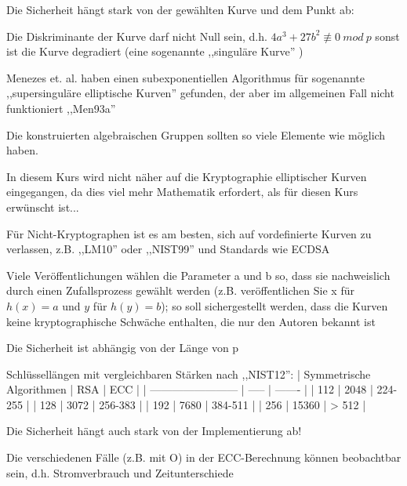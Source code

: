 \documentclass[a4paper]{article}
\begin{document}
\begin{multicols}{3}
      \begin{itemize*}
            \item Die Sicherheit hängt stark von der gewählten Kurve und dem Punkt ab:
            \item Die Diskriminante der Kurve darf nicht Null sein, d.h.
            $4a^3+27b^2\not\equiv
                  0\ mod\ p$ sonst ist die Kurve
            degradiert (eine sogenannte ,,singuläre Kurve'' )
            \item Menezes et. al. haben einen subexponentiellen Algorithmus für
            sogenannte ,,supersinguläre elliptische Kurven'' gefunden, der aber im
            allgemeinen Fall nicht funktioniert ,,Men93a''
            \item Die konstruierten algebraischen Gruppen sollten so viele Elemente wie
            möglich haben.
            \item In diesem Kurs wird nicht näher auf die Kryptographie elliptischer
            Kurven eingegangen, da dies viel mehr Mathematik erfordert, als für
            diesen Kurs erwünscht ist...
            \item Für Nicht-Kryptographen ist es am besten, sich auf vordefinierte
            Kurven zu verlassen, z.B. ,,LM10'' oder ,,NIST99'' und Standards
            wie ECDSA
            \item Viele Veröffentlichungen wählen die Parameter a und b so, dass sie
            nachweislich durch einen Zufallsprozess gewählt werden (z.B.
            veröffentlichen Sie x für $h(x)=a$ und $y$ für $h(y) = b$); so
            soll sichergestellt werden, dass die Kurven keine kryptographische
            Schwäche enthalten, die nur den Autoren bekannt ist
            \item Die Sicherheit ist abhängig von der Länge von p
            \begin{itemize*}
                  \item Schlüssellängen mit vergleichbaren Stärken nach ,,NIST12'': | Symmetrische Algorithmen | RSA | ECC | | ------------------------ | ----- | ------- | | 112 | 2048 | 224-255 | | 128 | 3072 | 256-383 | | 192 | 7680 | 384-511 | | 256 | 15360 | >{} 512 |
            \end{itemize*}
            \item Die Sicherheit hängt auch stark von der Implementierung ab!
            \begin{itemize*}
                  \item Die verschiedenen Fälle (z.B. mit O) in der ECC-Berechnung können beobachtbar sein, d.h. Stromverbrauch und Zeitunterschiede

\end{itemize*}
\end{itemize*}
\end{multicols}
\end{document}
